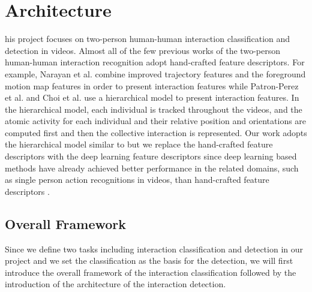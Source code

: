 %
%
\let\textcircled=\pgftextcircled
\chapter{Architecture}
\label{chap3}
his project focuses on two-person human-human interaction classification and detection in videos. Almost all of the few previous works \cite{patron2010} \cite{narayan2014} \cite{choi2012} of the two-person human-human interaction recognition adopt hand-crafted feature descriptors. For example, Narayan et al. \cite{narayan2014} combine improved trajectory features and the foreground motion map features in order to present interaction features while Patron-Perez et al. \cite{patron2010} and Choi et al. \cite{choi2012} use a hierarchical model to present interaction features. In the hierarchical model,  each individual is tracked throughout the videos, and the atomic activity for each individual and their relative position and orientations are computed first and then the collective interaction is represented. Our work adopts the hierarchical model similar to \cite{patron2010} but we replace the hand-crafted feature descriptors with the deep learning feature descriptors since deep learning based methods \cite{Ji2013} \cite{Tran2015} \cite{simonyan2014} \cite{Ng2015} have already achieved better performance in the related domains, such as single person action recognitions in videos, than hand-crafted feature descriptors\cite{grepory2010} \cite{alex2008} \cite{paul2007} \cite{wang2012} \cite{wang2013}. 
    
\section{Overall Framework}
\label{3_1}
Since we define two tasks including interaction classification and detection in our project and we set the classification as the basis for the detection, we will first introduce the overall framework of the interaction classification followed by the introduction of the architecture of the interaction detection.
